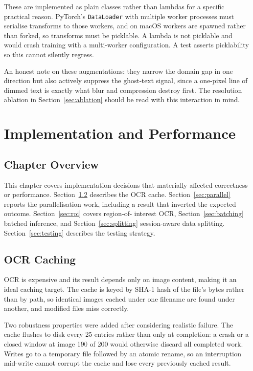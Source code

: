 \documentclass[12pt,oneside]{report}
\newcommand{\code}[1]{\texttt{\small #1}}
\begin{document}
These are implemented as plain classes rather than lambdas for a specific
practical reason. PyTorch's \code{DataLoader} with multiple worker processes
must serialise transforms to those workers, and on macOS workers are spawned
rather than forked, so transforms must be picklable. A lambda is not picklable
and would crash training with a multi-worker configuration. A test asserts
picklability so this cannot silently regress.

An honest note on these augmentations: they narrow the domain gap in one
direction but also actively suppress the ghost-text signal, since a one-pixel
line of dimmed text is exactly what blur and compression destroy first. The
resolution ablation in Section~\ref{sec:ablation} should be read with this
interaction in mind.

\chapter{Implementation and Performance}
\label{ch:implementation}

\section{Chapter Overview}

This chapter covers implementation decisions that materially affected
correctness or performance. Section~\ref{sec:cache} describes the OCR cache.
Section~\ref{sec:parallel} reports the parallelisation work, including a result
that inverted the expected outcome. Section~\ref{sec:roi} covers region-of-
interest OCR, Section~\ref{sec:batching} batched inference, and
Section~\ref{sec:splitting} session-aware data splitting.
Section~\ref{sec:testing} describes the testing strategy.

\section{OCR Caching}
\label{sec:cache}

OCR is expensive and its result depends only on image content, making it an
ideal caching target. The cache is keyed by SHA-1 hash of the file's bytes
rather than by path, so identical images cached under one filename are found
under another, and modified files miss correctly.

Two robustness properties were added after considering realistic failure. The
cache flushes to disk every 25 entries rather than only at completion: a crash
or a closed window at image 190 of 200 would otherwise discard all completed
work. Writes go to a temporary file followed by an atomic rename, so an
interruption mid-write cannot corrupt the cache and lose every previously
cached result.
\end{document}
